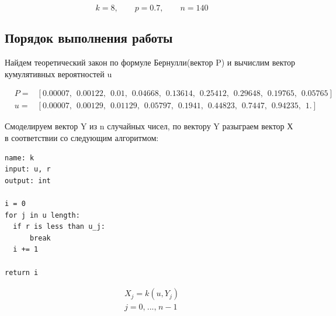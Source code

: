 \documentclass[a4paper, 14pt]{extarticle}
\begin{document}
\begin{equation*}
  k = 8, \qquad p = 0.7, \qquad n = 140
\end{equation*}

\subsection*{Порядок выполнения работы}

Найдем теоретический закон по формуле Бернулли(вектор P) и вычислим вектор
кумулятивных вероятностей u

\vspace{-10pt}

\begin{align*}
  & P =& \left[ 0.00007,\hspace{5pt} 0.00122,\hspace{5pt} 0.01   ,\hspace{5pt} 0.04668,\hspace{5pt} 0.13614,\hspace{5pt} 0.25412,\hspace{5pt} 0.29648,\hspace{5pt} 0.19765,\hspace{5pt} 0.05765\right] \\
  & u =& \left[0.00007,\hspace{5pt} 0.00129,\hspace{5pt} 0.01129,\hspace{5pt} 0.05797,\hspace{5pt} 0.1941 ,\hspace{5pt} 0.44823,\hspace{5pt} 0.7447 ,\hspace{5pt} 0.94235,\hspace{5pt} 1.     \right]
\end{align*}

Смоделируем вектор Y из n случайных чисел, 
по вектору Y разыграем вектор Х в соответствии со следующим алгоритмом:

\begin{center}
  \begin{minipage}{0.43\textwidth}
    \begin{tcolorbox}[colback=white!10, colframe=black, width=\textwidth]
      \begin{verbatim}
name: k
input: u, r
output: int

i = 0
for j in u length:
  if r is less than u_j:
      break
  i += 1

return i
      \end{verbatim}
    \end{tcolorbox}
  \end{minipage}
  \hspace*{0pt}
  \begin{minipage}{0.43\textwidth}
    \begin{gather*}
      X_j = k(u, Y_j) \\
      j = 0, \hspace{1pt} ..., \hspace{1pt} n - 1 
    \end{gather*}
  \end{minipage}
\end{center}
\end{document}
